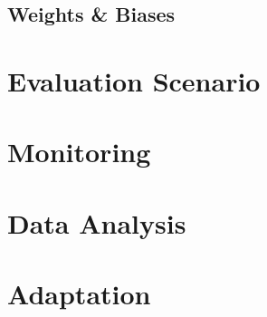   \subsection{Weights \& Biases}
  
\section{Evaluation Scenario}
\section{Monitoring}
\section{Data Analysis}
\section{Adaptation}
